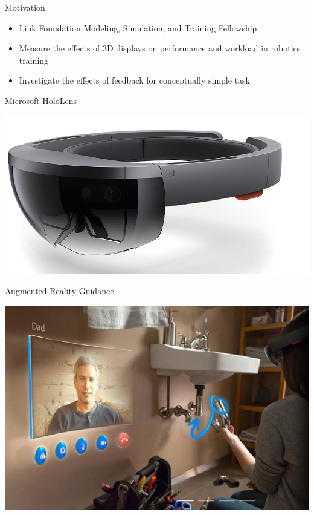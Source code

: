 \documentclass[10pt]{beamer}
\begin{document}
\begin{frame}[fragile]{Motivation}
  \begin{itemize}
    \setlength\itemsep{1em}
    \item Link Foundation Modeling, Simulation, and Training Fellowship
    \item Measure the effects of 3D displays on performance and workload in robotics training
    \item Investigate the effects of feedback for conceptually simple task
  \end{itemize}
\end{frame}

\begin{frame}[fragile]{Microsoft HoloLens}
  \begin{center}
    \includegraphics[width=\textwidth]{../img/Hololens.png}
  \end{center}
\end{frame}

\begin{frame}[fragile]{Augmented Reality Guidance}
  \begin{center}
    \includegraphics[width=\textwidth]{../img/sink.png}
  \end{center}
\end{frame}
\end{document}
